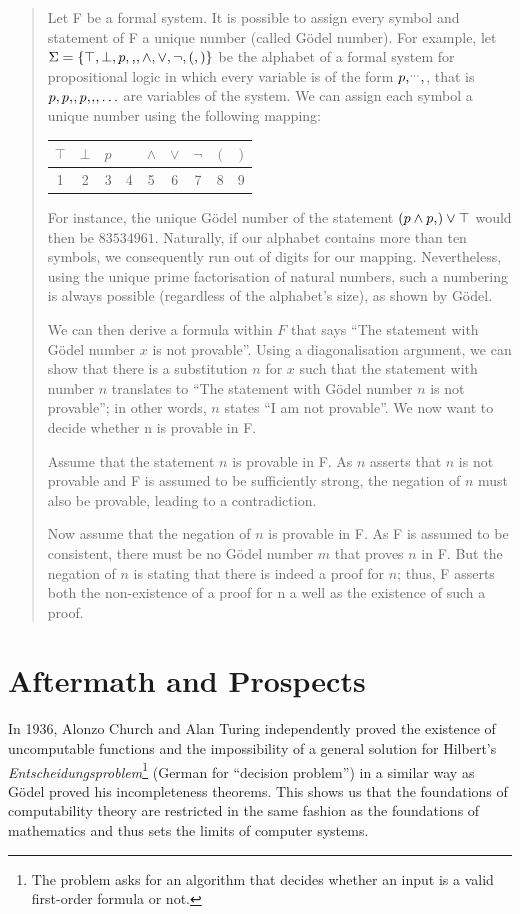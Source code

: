 \documentclass{article}
\newcommand*\vtick{\textsc{\char13}}
\begin{document}
\begin{quote}
Let F be a formal system. It is possible to assign every symbol and statement of F a unique number (called Gödel number). For example, let $\Sigma=\{\top,\bot,p,\vtick,\land,\lor,\lnot,(,)\}$ be the alphabet of a formal system for propositional logic in which every variable is of the form $p\vtick^{\ldots}\vtick$, that is $p,p\vtick,p\vtick\vtick,\ldots$ are variables of the system. We can assign each symbol a unique number using the following mapping:

\begin{center}
\begin{tabular}{| c | c | c | c | c | c | c | c | c |}
\hline $\top$ & $\bot$ & $p$ & \vtick & $\land$ & $\lor$ & $\lnot$ & $($ & $)$ \\
\hline 1 & 2 & 3 & 4 & 5 & 6 & 7 & 8 & 9\\
\hline
\end{tabular}
\end{center}
For instance, the unique Gödel number of the statement $(p\land p\vtick)\lor \top$ would then be $83534961$. Naturally, if our alphabet contains more than ten symbols, we consequently run out of digits for our mapping. Nevertheless, using the unique prime factorisation of natural numbers, such a numbering is always possible (regardless of the alphabet's size), as shown by Gödel.\cite{goedel_incompleteness}

We can then derive a formula within $F$ that says ``The statement with Gödel number $x$ is not provable''. Using a diagonalisation argument, we can show that there is a substitution $n$ for $x$ such that the statement with number $n$ translates to ``The statement with Gödel number $n$ is not provable''; in other words, $n$ states ``I am not provable''. We now want to decide whether n is provable in F.

Assume that the statement $n$ is provable in F. As $n$ asserts that $n$ is not provable and F is assumed to be sufficiently strong, the negation of $n$ must also be provable, leading to a contradiction.

Now assume that the negation of $n$ is provable in F. As F is assumed to be consistent, there must be no Gödel number $m$ that proves $n$ in F. But the negation of $n$ is stating that there is indeed a proof for $n$; thus, F asserts both the non-existence of a proof for n a well as the existence of such a proof.
\end{quote}

\section{Aftermath and Prospects}
In 1936, Alonzo Church and Alan Turing independently proved the existence of uncomputable functions and the impossibility of a general solution for Hilbert's \textit{Entscheidungspro\-blem}\footnote{The problem asks for an algorithm that decides whether an input is a valid first-order formula or not.} (German for ``decision problem'') in a similar way as Gödel proved his incompleteness theorems. This shows us that the foundations of computability theory are restricted in the same fashion as the foundations of mathematics and thus sets the limits of computer systems.
\end{document}
